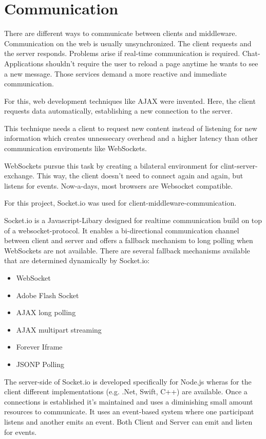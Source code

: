 \section{Communication}
There are different ways to communicate between clients and middleware. 
Communication on the web is usually unsynchronized. 
The client requests and the server responds. 
Problems arise if real-time communication is required. 
Chat-Applications shouldn't require the user to reload a page anytime he wants to see a new message.
Those services demand a more reactive and immediate communication.

For this, web development techniques like AJAX \parencite{ajax} were invented. 
Here, the client requests data automatically, establishing a new connection to the server.

This technique needs a client to request new content instead of listening 
for new information which creates unnessecary overhead and a higher latency than other communication enviroments like WebSockets.  
 
WebSockets pursue this task by creating a bilateral environment for clint-server-exchange. 
This way, the client doesn't need to connect again and again, but listens for events. 
Now-a-days, most browsers are Websocket compatible.

For this project, Socket.io was used for client-middleware-communication.

Socket.io is a Javascript-Libary designed for realtime communication build on top of a websocket-protocol.
It enables a bi-directional communication channel between client and server and offers a fallback mechanism to long polling when WebSockets are not available.
There are several fallback mechanisms available that are determined dynamically by Socket.io:
\begin{itemize}
    \item WebSocket
    \item Adobe Flash Socket
    \item AJAX long polling
    \item AJAX multipart streaming
    \item Forever Iframe
    \item JSONP Polling
\end{itemize}

The server-side of Socket.io is developed  specifically for Node.js wheras for the client different implementations (e.g. .Net, Swift, C++)\parencite{socketioClients} are available.
Once a connections is established it's maintained and uses a diminishing small amount resources to communicate. 
It uses an event-based system where one participant listens and another emits an event. 
Both Client and Server can emit and listen for events.
